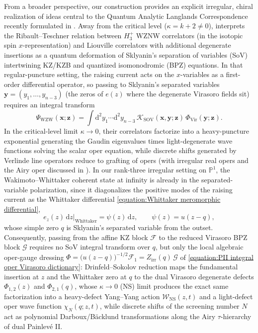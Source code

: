 \documentclass[a4paper,11pt]{article}
\newcommand{\cF}{\mathcal{F}}
\newcommand{\dd}{\mathrm{d}}
\numberwithin{equation}{section}
\begin{document}
From a broader perspective, our construction provides an explicit
irregular, chiral realization of ideas central to the Quantum Analytic
Langlands Correspondence recently formulated in
\cite{GaiottoTeschner2024}.  Away from the critical level
($\kappa=k+2\neq0$), \cite{GaiottoTeschner2024} interprets the Ribault--Teschner relation
between $H_{3}^{+}$ WZNW correlators (in the isotopic spin
$x$-representation) and Liouville correlators with additional
degenerate insertions as a quantum deformation of Sklyanin's
separation of variables (SoV) intertwining KZ/KZB and quantized
isomonodromic (BPZ) equations.  In that regular-puncture setting, the
raising current acts on the $x$-variables as a first-order differential
operator, so passing to Sklyanin's separated variables
$\bm{y}=(y_{1},\ldots,y_{n-3})$ (the zeros of $e(z)$ where the
degenerate Virasoro fields sit) requires an integral transform
\begin{equation}
	\Psi_{\mathrm{WZW}}(\bm{x};\bm{z})
	=\int\dd^{2}y_{1}\cdots\dd^{2}y_{n-3}\,
	\mathcal{K}_{\mathrm{SOV}}(\bm{x},\bm{y};\bm{z})\,
	\Phi_{\mathrm{Vir}}(\bm{y};\bm{z}).
\end{equation}
In the critical-level limit $\kappa\to0$, their correlators factorize
into a heavy-puncture exponential generating the Gaudin eigenvalues
times light-degenerate wave functions solving the scalar oper equation,
while discrete shifts generated by Verlinde line operators reduce to
grafting of opers (with irregular real opers and the Airy oper
discussed in \cite[Appendix~A.2]{GaiottoTeschner2024}).  In our
rank-three irregular setting on $\mathbb{P}^{1}$, the
Wakimoto--Whittaker coherent state at infinity is already in the
separated-variable polarization, since it diagonalizes the positive
modes of the raising current as the Whittaker differential
\eqref{equation:Whittaker meromorphic differential},
\begin{equation}
	\left.e_{z}(z)\,\dd z\right|_{\mathrm{Whittaker}}
	=\psi(z)\,\dd z,\qquad
	\psi(z)=u(z-q),
\end{equation}
whose simple zero $q$ is Sklyanin's separated variable from the
outset.  Consequently, passing from the affine KZ block $\cF$ to the
reduced Virasoro BPZ block $\mathcal{G}$ requires no SoV integral
transform over $q$, but only the local algebraic oper-gauge dressing
$\Phi=\bigl(u(z-q)\bigr)^{-1/2}\cF_{1}=Z_{\mathrm{irr}}(q)\,\mathcal{G}$
of \eqref{equation:PII integral oper Virasoro dictionary}:
Drinfeld--Sokolov reduction maps the fundamental insertion at $z$ and
the Whittaker zero at $q$ to the dual Virasoro degenerate defects
$\Phi_{1,2}(z)$ and $\Phi_{2,1}(q)$, whose $\kappa\to0$ (NS) limit
produces the exact same factorization into a heavy-defect Yang--Yang
action $\mathcal{W}_{\mathrm{NS}}(z,t)$ and a light-defect oper wave
function $\chi_{N}(q;z,t)$, while discrete shifts of the screening
number $N$ act as polynomial Darboux/B\"acklund transformations along
the Airy $\tau$-hierarchy of dual Painlev\'e II.
\end{document}
